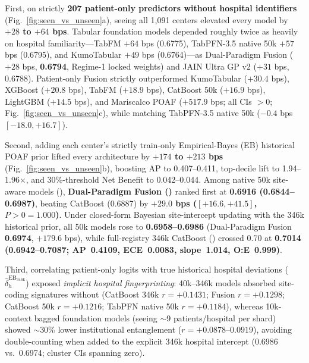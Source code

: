 First, on strictly \textbf{207 patient-only predictors without hospital identifiers} (Fig.~\ref{fig:seen_vs_unseen}a), seeing all 1,091 centers elevated every model by \textbf{$+28$ to $+64$ bps}. Tabular foundation models depended roughly twice as heavily on hospital familiarity---TabFM $+64$ bps (0.6775), TabPFN-3.5 native 50k $+57$ bps (0.6795), and KumoTabular $+49$ bps (0.6764)---as Dual-Paradigm Fusion ($+28$ bps, \textbf{0.6794}, Regime-1 locked weights) and JAIN Ultra GP v2 ($+31$ bps, 0.6788). Patient-only Fusion strictly outperformed KumoTabular ($+30.4$ bps), XGBoost ($+20.8$ bps), TabFM ($+18.9$ bps), CatBoost 50k ($+16.9$ bps), LightGBM ($+14.5$ bps), and Mariscalco POAF ($+517.9$ bps; all CIs $>0$; Fig.~\ref{fig:seen_vs_unseen}c), while matching TabPFN-3.5 native 50k ($-0.4$ bps $[-18.0, +16.7]$).

Second, adding each center's strictly train-only Empirical-Bayes (EB) historical POAF prior lifted every architecture by \textbf{$+174$ to $+213$ bps} (Fig.~\ref{fig:seen_vs_unseen}b), boosting AP to 0.407--0.411, top-decile lift to 1.94--1.96$\times$, and 30\%-threshold Net Benefit to 0.042--0.044. Among native 50k site-aware models (), \textbf{Dual-Paradigm Fusion ()} ranked first at \textbf{0.6916 (0.6844--0.6987)}, beating CatBoost  (0.6887) by \textbf{$+29.0$ bps ($[+16.6, +41.5]$, $P>0=1.000$)}. Under closed-form Bayesian site-intercept updating with the 346k historical prior, all 50k models rose to \textbf{0.6958--0.6986} (Dual-Paradigm Fusion \textbf{0.6974}, $+179.6$ bps), while full-registry 346k CatBoost () crossed 0.70 at \textbf{0.7014 (0.6942--0.7087; AP~0.4109, ECE~0.0083, slope~1.014, O:E~0.999)}.

Third, correlating patient-only logits with true historical hospital deviations ($\hat{\delta}_h^{\mathrm{EB}_{346\mathrm{k}}}$) exposed \emph{implicit hospital fingerprinting}: 40k--346k models absorbed site-coding signatures without  (CatBoost 346k $r=+0.1431$; Fusion $r=+0.1298$; CatBoost 50k $r=+0.1216$; TabPFN native 50k $r=+0.1184$), whereas 10k-context bagged foundation models (seeing $\sim$9 patients/hospital per shard) showed $\sim$30\% lower institutional entanglement ($r=+0.0878$--$0.0919$), avoiding double-counting when added to the explicit 346k hospital intercept (0.6986 vs.\ 0.6974; cluster CIs spanning zero).
